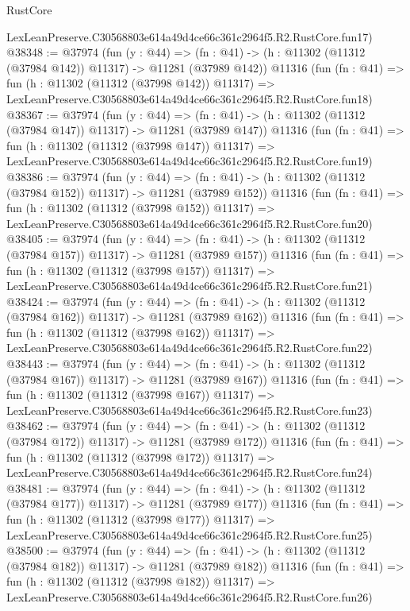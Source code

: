\begin{lexlean}{RustCore}
\begin{coremodule}
    LexLeanPreserve.C30568803e614a49d4ce66c361c2964f5.R2.RustCore.fun17)
@38348 := @37974
    (fun (y : @44) =>
    (fn : @41) -> (h : @11302 (@11312 (@37984 @142)) @11317) -> @11281 (@37989 @142))
    @11316
    (fun (fn : @41) =>
    fun (h : @11302 (@11312 (@37998 @142)) @11317) =>
    LexLeanPreserve.C30568803e614a49d4ce66c361c2964f5.R2.RustCore.fun18)
@38367 := @37974
    (fun (y : @44) =>
    (fn : @41) -> (h : @11302 (@11312 (@37984 @147)) @11317) -> @11281 (@37989 @147))
    @11316
    (fun (fn : @41) =>
    fun (h : @11302 (@11312 (@37998 @147)) @11317) =>
    LexLeanPreserve.C30568803e614a49d4ce66c361c2964f5.R2.RustCore.fun19)
@38386 := @37974
    (fun (y : @44) =>
    (fn : @41) -> (h : @11302 (@11312 (@37984 @152)) @11317) -> @11281 (@37989 @152))
    @11316
    (fun (fn : @41) =>
    fun (h : @11302 (@11312 (@37998 @152)) @11317) =>
    LexLeanPreserve.C30568803e614a49d4ce66c361c2964f5.R2.RustCore.fun20)
@38405 := @37974
    (fun (y : @44) =>
    (fn : @41) -> (h : @11302 (@11312 (@37984 @157)) @11317) -> @11281 (@37989 @157))
    @11316
    (fun (fn : @41) =>
    fun (h : @11302 (@11312 (@37998 @157)) @11317) =>
    LexLeanPreserve.C30568803e614a49d4ce66c361c2964f5.R2.RustCore.fun21)
@38424 := @37974
    (fun (y : @44) =>
    (fn : @41) -> (h : @11302 (@11312 (@37984 @162)) @11317) -> @11281 (@37989 @162))
    @11316
    (fun (fn : @41) =>
    fun (h : @11302 (@11312 (@37998 @162)) @11317) =>
    LexLeanPreserve.C30568803e614a49d4ce66c361c2964f5.R2.RustCore.fun22)
@38443 := @37974
    (fun (y : @44) =>
    (fn : @41) -> (h : @11302 (@11312 (@37984 @167)) @11317) -> @11281 (@37989 @167))
    @11316
    (fun (fn : @41) =>
    fun (h : @11302 (@11312 (@37998 @167)) @11317) =>
    LexLeanPreserve.C30568803e614a49d4ce66c361c2964f5.R2.RustCore.fun23)
@38462 := @37974
    (fun (y : @44) =>
    (fn : @41) -> (h : @11302 (@11312 (@37984 @172)) @11317) -> @11281 (@37989 @172))
    @11316
    (fun (fn : @41) =>
    fun (h : @11302 (@11312 (@37998 @172)) @11317) =>
    LexLeanPreserve.C30568803e614a49d4ce66c361c2964f5.R2.RustCore.fun24)
@38481 := @37974
    (fun (y : @44) =>
    (fn : @41) -> (h : @11302 (@11312 (@37984 @177)) @11317) -> @11281 (@37989 @177))
    @11316
    (fun (fn : @41) =>
    fun (h : @11302 (@11312 (@37998 @177)) @11317) =>
    LexLeanPreserve.C30568803e614a49d4ce66c361c2964f5.R2.RustCore.fun25)
@38500 := @37974
    (fun (y : @44) =>
    (fn : @41) -> (h : @11302 (@11312 (@37984 @182)) @11317) -> @11281 (@37989 @182))
    @11316
    (fun (fn : @41) =>
    fun (h : @11302 (@11312 (@37998 @182)) @11317) =>
    LexLeanPreserve.C30568803e614a49d4ce66c361c2964f5.R2.RustCore.fun26)

\end{coremodule}
\end{lexlean}
